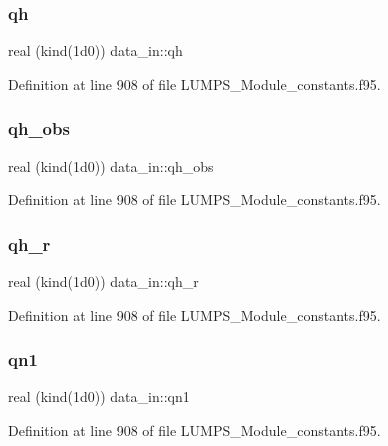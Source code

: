 \subsubsection{\texorpdfstring{qh}{qh}}
{\footnotesize\ttfamily real (kind(1d0)) data\+\_\+in\+::qh}



Definition at line 908 of file L\+U\+M\+P\+S\+\_\+\+Module\+\_\+constants.\+f95.

\mbox{\label{namespacedata__in_a333bca61a59b05a5a5db0c7bb9daa2b9}} 
\subsubsection{\texorpdfstring{qh\+\_\+obs}{qh\_obs}}
{\footnotesize\ttfamily real (kind(1d0)) data\+\_\+in\+::qh\+\_\+obs}



Definition at line 908 of file L\+U\+M\+P\+S\+\_\+\+Module\+\_\+constants.\+f95.

\mbox{\label{namespacedata__in_a7144dc07db9d95f72aedabd88c44bf99}} 
\subsubsection{\texorpdfstring{qh\+\_\+r}{qh\_r}}
{\footnotesize\ttfamily real (kind(1d0)) data\+\_\+in\+::qh\+\_\+r}



Definition at line 908 of file L\+U\+M\+P\+S\+\_\+\+Module\+\_\+constants.\+f95.

\mbox{\label{namespacedata__in_ae6fa09bb6b28e70653d0957e003b6f57}} 
\subsubsection{\texorpdfstring{qn1}{qn1}}
{\footnotesize\ttfamily real (kind(1d0)) data\+\_\+in\+::qn1}



Definition at line 908 of file L\+U\+M\+P\+S\+\_\+\+Module\+\_\+constants.\+f95.


